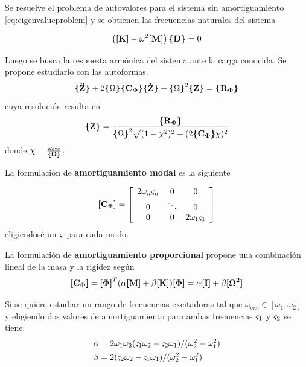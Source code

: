 \documentclass[onecolumn,10pt,titlepage,a4paper]{article}
\begin{document}
Se resuelve el problema de autovalores para el sistema sin amortiguamiento \eqref{eq:eigenvalueproblem} y se obtienen las frecuencias naturales del sistema 

\begin{equation} \label{eq:eigenvalueproblem}
	\left( \boldsymbol{[}\mathbf{K} \boldsymbol{]} - \omega^2 \boldsymbol{[}\mathbf{M} \boldsymbol{]}\right)\boldsymbol{\{ }\mathbf{D} \boldsymbol{\}}= 0
\end{equation}

Luego se busca la respuesta armónica del sistema ante la carga conocida. Se propone estudiarlo con las autoformas.
\begin{equation} \label{eq:Zmodal}
	 \boldsymbol{\{ }\mathbf{\boldsymbol{\ddot{\mathrm{Z}}}} \boldsymbol{\}}+2\boldsymbol{\{ } \Omega \boldsymbol{\} } \boldsymbol{\{ }\mathbf{C{_{\boldsymbol{\Phi}}}} \boldsymbol{\}} \boldsymbol{\{ }\mathbf{\boldsymbol{\dot{\mathrm{Z}}}} \boldsymbol{\}} + \boldsymbol{\{ } \Omega \boldsymbol{\} }^2 \boldsymbol{\{ }\mathbf{Z} \boldsymbol{\}} = \boldsymbol{\{ }\mathbf{R{_{\boldsymbol{\Phi}}}} \boldsymbol{\}}
\end{equation}
cuya resolución resulta en 
\begin{equation}
	\boldsymbol{\{ }\mathbf{Z} \boldsymbol{\}} = \frac{\boldsymbol{\{ }\mathbf{R{_{\boldsymbol{\Phi}}} } \boldsymbol{\}}}{{\boldsymbol{\{ } \Omega \boldsymbol{\} }}^2 \sqrt{(1-\chi^2)^2 + (2 \boldsymbol{\{ }\mathbf{C{_{\boldsymbol{\Phi}}}} \boldsymbol{\}} \chi)^2}}
\end{equation}
donde $\chi = \frac{\omega_{\mathrm{exc}}}{\boldsymbol{\{ }\mathbf{\Omega} \boldsymbol{\}}}$.

La formulación de \textbf{amortiguamiento modal} es la siguiente

\begin{equation}
\boldsymbol{[}\mathbf{C{_{\boldsymbol{\Phi}}}} \boldsymbol{]}=\left[ \begin{array}{ccc}{2 \omega_{n} \varsigma_{n}} & {0} & {0} \\ {0} & {\ddots} & {0} \\ {0} & {0} & {2 \omega_{1} \varsigma_{1}}\end{array}\right]
\end{equation}
eligiendosé un $\varsigma$ para cada modo.

La formulación de \textbf{amortiguamiento proporcional} propone una combinación lineal de la masa y la rigidez según
\begin{equation} \label{eq:proporcional}
\boldsymbol{[}\mathbf{C{_{\boldsymbol{\Phi}}}} \boldsymbol{]} = \boldsymbol{[}\mathbf{\boldsymbol{\Phi}} \boldsymbol{]}^T ( \alpha \boldsymbol{[}\mathbf{M} \boldsymbol{]}+\beta \boldsymbol{[}\mathbf{K} \boldsymbol{]})\boldsymbol{[}\mathbf{\boldsymbol{\Phi}} \boldsymbol{]} = \alpha \boldsymbol{[}\mathbf{I} \boldsymbol{]} +\beta \boldsymbol{[}\mathbf{\boldsymbol{\Omega}^2} \boldsymbol{]}
\end{equation}

Si se quiere estudiar un rango de frecuencias excitadoras tal que $\omega_{\mathrm{exc}}\in [\omega_1, \omega_2]$ y eligiendo dos valores de amortiguamiento para ambas frecuencias $\varsigma_1$ y $\varsigma_2$ se tiene: \cite{cook2007concepts}
\begin{align} \label{eq:alfabeta}
\alpha &= 2\omega_1 \omega_2 (\varsigma_1 \omega_2 -\varsigma_2 \omega_1)/(\omega_2^2 - \omega_1^2) \\ \beta &= 2(\varsigma_2\omega_2 -\varsigma_1 \omega_1)/(\omega_2^2 - \omega_1^2)
\end{align}
\end{document}
